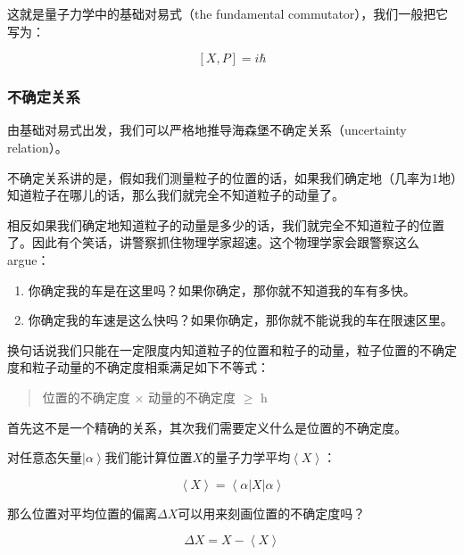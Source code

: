 这就是量子力学中的基础对易式（the fundamental commutator），我们一般把它写为：

\begin{equation}
\left[ X, P \right] = i \hbar
\end{equation}

\subsubsection{不确定关系}

由基础对易式出发，我们可以严格地推导海森堡不确定关系（uncertainty relation）。

不确定关系讲的是，假如我们测量粒子的位置的话，如果我们确定地（几率为1地）知道粒子在哪儿的话，那么我们就完全不知道粒子的动量了。

相反如果我们确定地知道粒子的动量是多少的话，我们就完全不知道粒子的位置了。因此有个笑话，讲警察抓住物理学家超速。这个物理学家会跟警察这么argue：

\begin{enumerate}
\item 

你确定我的车是在这里吗？如果你确定，那你就不知道我的车有多快。

\item

你确定我的车速是这么快吗？如果你确定，那你就不能说我的车在限速区里。

\end{enumerate}

换句话说我们只能在一定限度内知道粒子的位置和粒子的动量，粒子位置的不确定度和粒子动量的不确定度相乘满足如下不等式：

\begin{quotation}
位置的不确定度 $\times$ 动量的不确定度 $\ge $ h
\end{quotation}

首先这不是一个精确的关系，其次我们需要定义什么是位置的不确定度。

对任意态矢量$\left| \alpha \right\rangle$我们能计算位置$X$的量子力学平均$\left\langle X \right\rangle$：

\begin{equation}
\left\langle X \right\rangle = \left\langle \alpha \right| X \left| \alpha \right\rangle
\end{equation}

那么位置对平均位置的偏离$\Delta X$可以用来刻画位置的不确定度吗？

\begin{equation}
\Delta X = X  -  \left\langle X \right\rangle
\end{equation}

